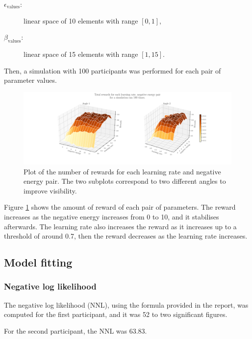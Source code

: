 \documentclass[12pt]{article}
\begin{document}
\begin{description}
\item[$\epsilon_{\mathrm{values}}$:] linear space of 10 elements with range $[0, 1]$, 
\item[$\beta_{\mathrm{values}}$:] linear space of 15 elements with range $[1, 15]$.
\end{description}

Then, a simulation with 100 participants was performed for each pair of parameter values. 

\begin{figure}[h!]
	\centering
	\hspace*{-2.2in}
	\includegraphics[width=1.5\linewidth]{figures/2.3.pdf}
	\caption{Plot of the number of rewards for each learning rate and negative energy pair. The two subplots correspond to two different angles to improve visibility.}
	\label{fig:2.3}
\end{figure}

Figure \ref{fig:2.3} shows the amount of reward of each pair of parameters. The reward increases as the negative energy increases from 0 to 10, and it stabilises afterwards. The learning rate also increases the reward as it increases up to a threshold of around 0.7, then the reward decreases as the learning rate increases.

\subsection{Model fitting}

\subsubsection{Negative log likelihood}

The negative log likelihood (NNL), using the formula provided in the report, was computed for the first participant, and it was 52 to two significant figures. 

For the second participant, the NNL was 63.83.




\end{document}
